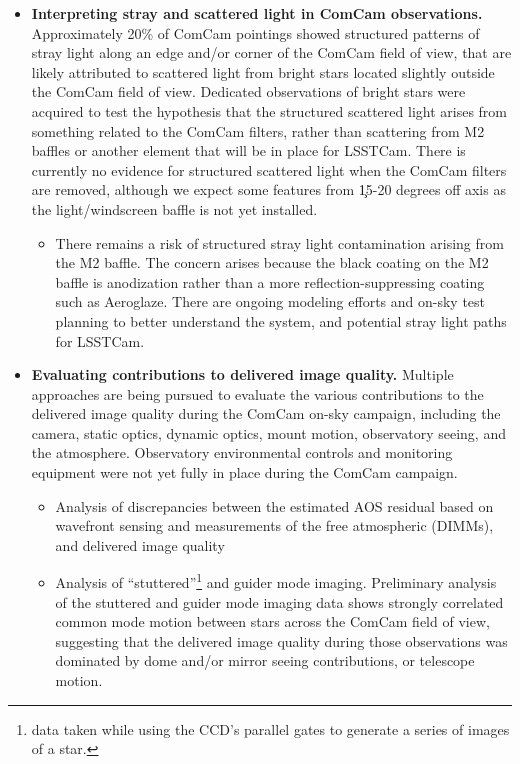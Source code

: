 \begin{itemize}
    \item \textbf{Interpreting stray and scattered light in ComCam observations.} Approximately 20\% of ComCam pointings showed structured patterns of stray light along an edge and/or corner of the ComCam field of view, that are likely attributed to scattered light from bright stars located slightly outside the ComCam field of view.
    Dedicated observations of bright stars were acquired to test the hypothesis that the structured scattered light arises from something related to the ComCam filters, rather than scattering from M2 baffles or another element that will be in place for LSSTCam.
    There is currently no evidence for structured scattered light when the ComCam filters are removed,
    although we expect some features from \c 15-20 degrees off axis as the light/windscreen baffle is
    not yet installed.
    \begin{itemize}
        \item There remains a risk of structured stray light contamination arising from the M2 baffle.
        The concern arises because the black coating on the M2 baffle is anodization rather than a more reflection-suppressing coating such as Aeroglaze.
        There are ongoing modeling efforts and on-sky test planning to better understand the system, and potential stray light paths for LSSTCam.
    \end{itemize}
    \item \textbf{Evaluating contributions to delivered image quality.} Multiple approaches are being pursued to evaluate the various contributions to the delivered image quality during the ComCam on-sky campaign, including the camera, static optics, dynamic optics, mount motion, observatory seeing, and the atmosphere. Observatory environmental controls and monitoring equipment were not yet fully in place during the ComCam campaign.
    \begin{itemize}
        \item Analysis of discrepancies between the estimated AOS residual based on wavefront sensing and
          measurements of the free atmospheric (\eg DIMMs), and delivered image quality
        \item Analysis of ``stuttered''\footnote{data taken while using the CCD's parallel gates to generate
            a series of images of a star.} and guider mode imaging. Preliminary analysis of the stuttered and guider mode imaging data shows strongly correlated common mode motion between stars across the ComCam field of view, suggesting that the delivered image quality during those observations was dominated by dome and/or mirror seeing contributions, or telescope motion.

\end{itemize}
\end{itemize}
